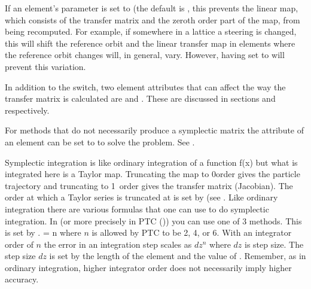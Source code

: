 If an element's  parameter is set to  (the default is ,
this prevents the linear map, which consists of the transfer matrix and the zeroth order part of the
map, from being recomputed. For example, if somewhere in a lattice a steering is changed, this will
shift the reference orbit and the linear transfer map in elements where the reference orbit changes
will, in general, vary. However, having  set to  will prevent this
variation.

In addition to the  switch, two element attributes that can affect the way the
transfer matrix is calculated are  and . These are
discussed in sections  and  respectively.

For methods that do not necessarily produce a symplectic matrix the  attribute of an
element can be set to  to solve the problem. See .

Symplectic integration is like ordinary integration of a function f(x) but what is integrated here
is a Taylor map. Truncating the map to 0\Th order gives the particle trajectory and truncating to
1\St\ order gives the transfer matrix (Jacobian).  The order at which a Taylor series is truncated
at is set by  (see . Like ordinary integration there are various
formulas that one can use to do symplectic integration. In \bmad (or more precisely in PTC
()) you can use one of 3 methods. This is set by .
 = n where $n$ is allowed by PTC to be 2, 4, or 6. With an integrator order of
$n$ the error in an integration step scales as $dz^n$ where $dz$ is step size. The step size $dz$ is
set by the length of the element and the value of . Remember, as in ordinary
integration, higher integrator order does not necessarily imply higher accuracy.

